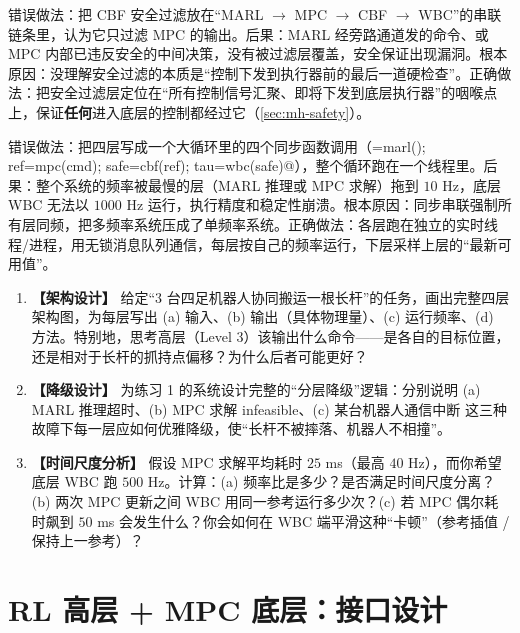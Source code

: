 \begin{pitfall}
错误做法：把 CBF 安全过滤放在“MARL $\to$ MPC $\to$ CBF $\to$ WBC”的串联链条里，认为它只过滤 MPC 的输出。后果：MARL 经旁路通道发的命令、或 MPC 内部已违反安全的中间决策，没有被过滤层覆盖，安全保证出现漏洞。根本原因：没理解安全过滤的本质是“控制下发到执行器前的最后一道硬检查”。正确做法：把安全过滤层定位在“所有控制信号汇聚、即将下发到底层执行器”的咽喉点上，保证\textbf{任何}进入底层的控制都经过它（\cref{sec:mh-safety}）。
\end{pitfall}

\begin{pitfall}
错误做法：把四层写成一个大循环里的四个同步函数调用（\verb@cmd=marl(); ref=mpc(cmd); safe=cbf(ref); tau=wbc(safe)@），整个循环跑在一个线程里。后果：整个系统的频率被最慢的层（MARL 推理或 MPC 求解）拖到 $10$ Hz，底层 WBC 无法以 $1000$ Hz 运行，执行精度和稳定性崩溃。根本原因：同步串联强制所有层同频，把多频率系统压成了单频率系统。正确做法：各层跑在独立的实时线程/进程，用无锁消息队列通信，每层按自己的频率运行，下层采样上层的“最新可用值”。
\end{pitfall}

\begin{practice}
\begin{enumerate}
  \item \textbf{【架构设计】} 给定“$3$ 台四足机器人协同搬运一根长杆”的任务，画出完整四层架构图，为每层写出 (a) 输入、(b) 输出（具体物理量）、(c) 运行频率、(d) 方法。特别地，思考高层（Level 3）该输出什么命令——是各自的目标位置，还是相对于长杆的抓持点偏移？为什么后者可能更好？
  \item \textbf{【降级设计】} 为练习 1 的系统设计完整的“分层降级”逻辑：分别说明 (a) MARL 推理超时、(b) MPC 求解 infeasible、(c) 某台机器人通信中断 这三种故障下每一层应如何优雅降级，使“长杆不被摔落、机器人不相撞”。
  \item \textbf{【时间尺度分析】} 假设 MPC 求解平均耗时 $25$ ms（最高 $40$ Hz），而你希望底层 WBC 跑 $500$ Hz。计算：(a) 频率比是多少？是否满足时间尺度分离？(b) 两次 MPC 更新之间 WBC 用同一参考运行多少次？(c) 若 MPC 偶尔耗时飙到 $50$ ms 会发生什么？你会如何在 WBC 端平滑这种“卡顿”（参考插值 / 保持上一参考）？
\end{enumerate}
\end{practice}

\section{RL 高层 + MPC 底层：接口设计}
\label{sec:mh-interface}

